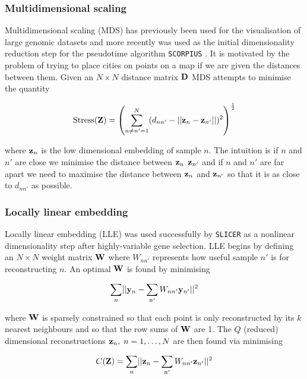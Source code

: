 \subsubsection{Multidimensional scaling}

Multidimensional scaling (MDS) has previously been used for the visualisation of large genomic datasets \cite{tzeng2008multidimensional} and more recently was used as the initial dimensionality reduction step for the pseudotime algorithm \texttt{SCORPIUS} \cite{cannoodt2016scorpius}. It is motivated by the problem of trying to place cities on points on a map if we are given the distances between them. Given an $N \times N$ distance matrix $\mathbf{D}$ MDS attempts to minimise the quantity

\begin{equation}
  \text{Stress}(\mathbf{Z}) = \left(
  \sum_{n \neq n' = 1}^N (d_{nn'} - \lvert \lvert \mathbf{z}_n - \mathbf{z}_{n'} \rvert \rvert)^2
  \right)^{\frac{1}{2}}
\end{equation}

where $\mathbf{z}_n$ is the low dimensional embedding of sample $n$. The intuition is if $n$ and $n'$ are close we minimise the distance between  $\mathbf{z}_n$  $\mathbf{z}_{n'}$ and if $n$ and $n'$ are far apart we need to maximise the distance between  $\mathbf{z}_n$  and $\mathbf{z}_{n'}$ so that it is as close to $d_{nn'}$ as possible.

\subsubsection{Locally linear embedding} \label{sec:lle}

Locally linear embedding (LLE) was used successfully by \texttt{SLICER} \cite{welch2016slicer} as a nonlinear dimensionality step after highly-variable gene selection. LLE begins by defining an $N \times N$ weight matrix $\mathbf{W}$ where $W_{nn'}$ represents how useful sample $n'$ is for reconstructing $n$. An optimal $\mathbf{W}$ is found by minimising

\begin{equation}
  \sum_{n} \lvert \lvert \mathbf{y}_n - \sum_{n'} W_{nn'} \mathbf{y}_{n'} \rvert \rvert^2
\end{equation}

where $\mathbf{W}$ is sparsely constrained so that each point is only reconstructed by its $k$ nearest neighbours and so that the row sums of $\mathbf{W}$ are 1. The $Q$ (reduced) dimensional reconstructions $\mathbf{z}_n, \; n = 1, \ldots, N$ are then found via minimising

\begin{equation}
  C(\mathbf{Z}) = \sum_{n} \lvert \lvert \mathbf{z}_n - \sum_{n'} W_{nn'} \mathbf{z}_{n'} \rvert \rvert^2
\end{equation}

